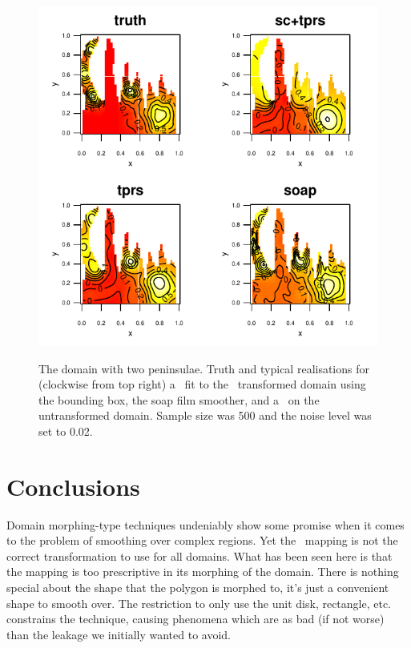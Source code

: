\begin{figure}
\centering
\includegraphics[width=6in]{sc/figs/wigglytop2-bbox-real.pdf} \\
\caption{The domain with two peninsulae. Truth and typical realisations for (clockwise from top right) a \tprs\ fit to the \sch\ transformed domain using the bounding box, the soap film smoother, and a \tprs\ on the untransformed domain. Sample size was 500 and the noise level was set to 0.02.}
\label{wigglytop2-bbox-real}
\end{figure}


\section{Conclusions}

Domain morphing-type techniques undeniably show some promise when it comes to the problem of smoothing over complex regions. Yet the \sch\ mapping is not the correct transformation to use for  all domains. What has been seen here is that the mapping is too prescriptive in its morphing of the domain. There is nothing special about the shape that the polygon is morphed to, it's just a convenient shape to smooth over. The restriction to only use the unit disk, rectangle, etc. constrains the technique, causing phenomena which are as bad (if not worse) than the leakage we initially wanted to avoid.

